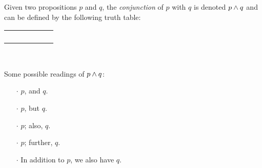 \begin{definition}[Conjunction]
    \begin{center}
        \begin{minipage}[t]{.55\linewidth}
            Given two propositions \(p\) and \(q\), the \emph{conjunction} of \(p\) with \(q\)
            is denoted \(p \wedge q\) and can be defined by the following truth table:
            \begin{table}[H]
                \centering
                \label{tab:and}
                \begin{tabular}{|CcCc||Cc|}
                    \hline
                     &  &  \\ \hline
                    \thead{\(\top\)} & \thead{\(\top\)} &  \\
                    \thead{\(\top\)} & \thead{\(\bot\)} &  \\
                    \thead{\(\bot\)} & \thead{\(\top\)} &  \\
                    \thead{\(\bot\)} & \thead{\(\bot\)} &  \\ \hline
                \end{tabular}
            \end{table}
        \end{minipage}%
        \begin{minipage}[t]{.05\linewidth}
            ~
        \end{minipage}%
        \begin{minipage}[t]{.4\linewidth}
            Some possible readings of \(p \wedge q\):\\
            \begin{itemize}
                \item[\(\cdot\)]
                    \(p\), and \(q\).
                \item[\(\cdot\)]
                    \(p\), but \(q\).
                \item[\(\cdot\)]
                    \(p\); also, \(q\).
                \item[\(\cdot\)]
                    \(p\); further, \(q\).
                \item[\(\cdot\)]
                    In addition to \(p\), we also have \(q\).
            \end{itemize}
        \end{minipage}
    \end{center}
\end{definition}


